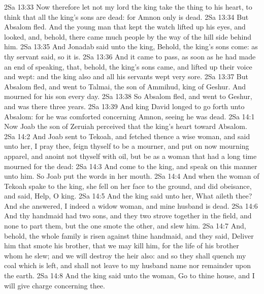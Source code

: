 \vs 2Sa 13:33 Now therefore let not my lord the king take the thing to his heart, to think that all the king's sons are dead: for Amnon only is dead.
\vs 2Sa 13:34 But Absalom fled. And the young man that kept the watch lifted up his eyes, and looked, and, behold, there came much people by the way of the hill side behind him.
\vs 2Sa 13:35 And Jonadab said unto the king, Behold, the king's sons come: as thy servant said, so it is.
\vs 2Sa 13:36 And it came to pass, as soon as he had made an end of speaking, that, behold, the king's sons came, and lifted up their voice and wept: and the king also and all his servants wept very sore.
\vs 2Sa 13:37 But Absalom fled, and went to Talmai, the son of Ammihud, king of Geshur. And  mourned for his son every day.
\vs 2Sa 13:38 So Absalom fled, and went to Geshur, and was there three years.
\vs 2Sa 13:39 And  king David longed to go forth unto Absalom: for he was comforted concerning Amnon, seeing he was dead.
\vs 2Sa 14:1 Now Joab the son of Zeruiah perceived that the king's heart  toward Absalom.
\vs 2Sa 14:2 And Joab sent to Tekoah, and fetched thence a wise woman, and said unto her, I pray thee, feign thyself to be a mourner, and put on now mourning apparel, and anoint not thyself with oil, but be as a woman that had a long time mourned for the dead:
\vs 2Sa 14:3 And come to the king, and speak on this manner unto him. So Joab put the words in her mouth.
\vs 2Sa 14:4 And when the woman of Tekoah spake to the king, she fell on her face to the ground, and did obeisance, and said, Help, O king.
\vs 2Sa 14:5 And the king said unto her, What aileth thee? And she answered, I  indeed a widow woman, and mine husband is dead.
\vs 2Sa 14:6 And thy handmaid had two sons, and they two strove together in the field, and  none to part them, but the one smote the other, and slew him.
\vs 2Sa 14:7 And, behold, the whole family is risen against thine handmaid, and they said, Deliver him that smote his brother, that we may kill him, for the life of his brother whom he slew; and we will destroy the heir also: and so they shall quench my coal which is left, and shall not leave to my husband  name nor remainder upon the earth.
\vs 2Sa 14:8 And the king said unto the woman, Go to thine house, and I will give charge concerning thee.
